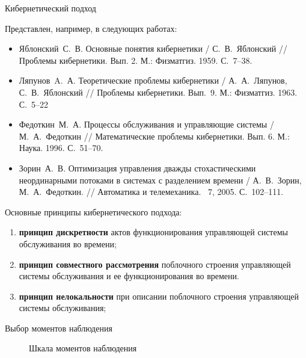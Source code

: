 \documentclass[10pt]{beamer}
\begin{document}
\begin{frame}[allowframebreaks]{Кибернетический подход}
\begin{block}{}
Представлен, например, в следующих работах:
\begin{itemize}
\item Яблонский~С.~В. Основные понятия кибернетики / С.~В.~Яблонский // Проблемы кибернетики. Вып. 2. М.: Физматгиз. 1959. С.~7--38.
  \item Ляпунов~A.~А. Теоретические проблемы кибернетики / А.~А.~Ляпунов, С.~В.~Яблонский // Проблемы кибернетики. Вып.~9. М.: Физматгиз. 1963. С.~5--22
\item Федоткин~М.~А. Процессы обслуживания и управляющие системы / М.~А.~Федоткин //  Математические проблемы кибернетики. Вып. 6. М.: Наука. 1996. С.~51--70.
\item Зорин~А.~В. Оптимизация управления дважды стохастическими неординарными потоками в системах с разделением времени / А.~В.~Зорин, М.~А.~Федоткин. // Автоматика и телемеханика. \No~7, 2005. С.~102--111.
\end{itemize}
\end{block}

  \framebreak

Основные принципы кибернетического подхода:
  \begin{enumerate}
  \item \textbf{принцип дискретности} актов функционирования управляющей системы обслуживания во времени;
    \item \textbf{принцип совместного
    рассмотрения} поблочного строения управляющей системы
    обслуживания и ее функционирования во времени.
  \item \textbf{принцип нелокальности} при описании поблочного
    строения управляющей системы обслуживания;
  \end{enumerate}
  \framebreak
  
Выбор моментов наблюдения
   \begin{figure}[h]
    \centering
    \caption{Шкала моментов наблюдения}
    \label{AZ:fig:3}
  \end{figure}

\framebreak


\end{frame}
\end{document}

